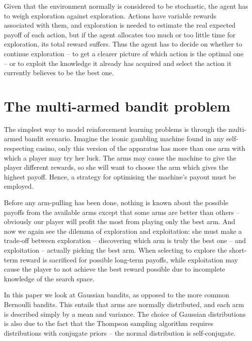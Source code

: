 Given that the environment normally is considered to be stochastic, the agent has to weigh exploration against exploration.
Actions have variable rewards associated with them, and exploration is needed to estimate the real expected payoff of each action, but if the agent allocates too much or too little time for exploration, its total reward suffers.
Thus the agent has to decide on whether to continue exploration -- to get a clearer picture of which action is the optimal one -- or to exploit the knowledge it already has acquired and select the action it currently believes to be the best one.

\section{The multi-armed bandit problem}
The simplest \cite{Kaelbling1996} way to model reinforcement learning problems is through the multi-armed bandit scenario.
Imagine the iconic gambling machine found in any self-respecting casino, only this version of the apparatus has more than one arm with which a player may try her luck.
The arms may cause the machine to give the player different rewards, so she will want to choose the arm which gives the highest payoff.
Hence, a strategy for optimising the machine's payout must be employed.

Before any arm-pulling has been done, nothing is known about the possible payoffs from the available arms except that some arms are better than others -- obviously our player will profit the most from playing only the best arm.
And now we again see the dilemma of exploration and exploitation: she must make a trade-off between exploration 
-- discovering which arm is truly the best one -- and exploitation -- actually picking the best arm.
When selecting to explore the short-term reward is sacrificed for possible long-term payoffs, while exploitation may cause the player to not achieve the best reward possible due to incomplete knowledge of the search space.

In this paper we look at Gaussian bandits, as opposed to the more common Bernoulli bandits.
This entails that arms are normally distributed, and each arm is described simply by a mean and variance.
The choice of Gaussian distributions is also due to the fact that the Thompson sampling algorithm requires distributions with conjugate priors -- the normal distribution is self-conjugate.


